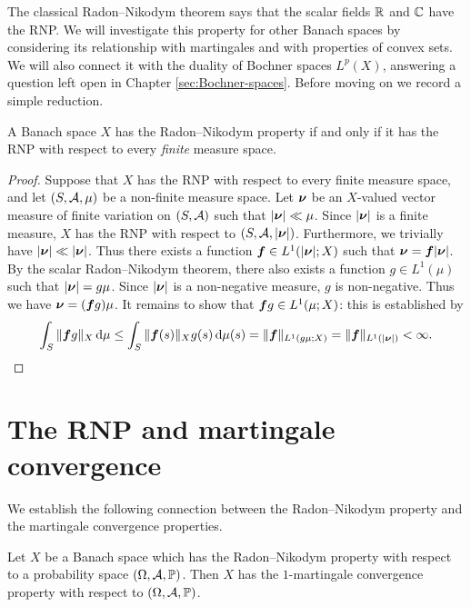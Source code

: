 The classical Radon--Nikodym theorem says that the scalar fields $\mathbb{R}$ and $\mathbb{C}$ have the RNP.
We will investigate this property for other Banach spaces by considering its relationship with martingales and with properties of convex sets.
We will also connect it with the duality of Bochner spaces $L^p(X)$, answering a question left open in Chapter \ref{sec:Bochner-spaces}.
Before moving on we record a simple reduction.

\begin{prop}\label{prop:RNP-finite-sufficient}
  A Banach space $X$ has the Radon--Nikodym property if and only if it has the RNP with respect to every \emph{finite} measure space.
\end{prop}

\begin{proof}
  Suppose that $X$ has the RNP with respect to every finite measure space, and let $(S,\mathcal{A},\mu)$ be a non-finite measure space.
  Let $\bm{\nu}$ be an $X$-valued vector measure of finite variation on $(S,\mathcal{A})$ such that $|\bm{\nu}| \ll \mu$.
  Since $|\bm{\nu}|$ is a finite measure, $X$ has the RNP with respect to $(S,\mathcal{A},|\bm{\nu}|)$.
  Furthermore, we trivially have $|\bm{\nu}| \ll |\bm{\nu}|$.
  Thus there exists a function $\bm{f} \in L^1(|\bm{\nu}|;X)$ such that $\bm{\nu} = \bm{f}|\bm{\nu}|$.
  By the scalar Radon--Nikodym theorem, there also exists a function $g \in L^1(\mu)$ such that $|\bm{\nu}| = g\mu$.
  Since $|\bm{\nu}|$ is a non-negative measure, $g$ is non-negative.
  Thus we have $\bm{\nu} = (\bm{f}g)\mu$.
  It remains to show that $\bm{f}g \in L^1(\mu;X)$: this is established by
  \begin{equation*}
    \int_{S} \|\bm{f}g\|_{X} \, \mathrm{d}\mu
    \leq \int_{S} \|\bm{f}(s)\|_{X} g(s) \, \mathrm{d}\mu(s) = \|\bm{f}\|_{L^1(g\mu;X)} = \|\bm{f}\|_{L^1(|\bm{\nu}|)} < \infty. 
  \end{equation*}
\end{proof}

\section{The RNP and martingale convergence}

We establish the following connection between the Radon--Nikodym property and the martingale convergence properties.

\begin{thm}\label{thm:RNP-MCP}
  Let $X$ be a Banach space which has the Radon--Nikodym property with respect to a probability space $(\Omega,\mathcal{A},\mathbb{P})$.
  Then $X$ has the $1$-martingale convergence property with respect to $(\Omega,\mathcal{A},\mathbb{P})$.
\end{thm}

